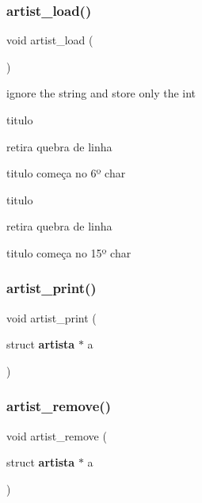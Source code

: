\mbox{\label{menu__artist_8c_ac92e93ea1e283f63cd157c3de3bda0d2}} 
\subsubsection{artist\_load()}
{\footnotesize\ttfamily void artist\+\_\+load (\begin{DoxyParamCaption}{ }\end{DoxyParamCaption})}

ignore the string and store only the int

titulo

retira quebra de linha

titulo começa no 6º char

titulo

retira quebra de linha

titulo começa no 15º char \mbox{\label{menu__artist_8c_a0b753a63f0f576d94160e7d073332c66}} 
\subsubsection{artist\_print()}
{\footnotesize\ttfamily void artist\+\_\+print (\begin{DoxyParamCaption}\item[{struct \textbf{ artista} $\ast$}]{a }\end{DoxyParamCaption})}

\mbox{\label{menu__artist_8c_abc42f3a57f943f92d23752d9650031f9}} 
\subsubsection{artist\_remove()}
{\footnotesize\ttfamily void artist\+\_\+remove (\begin{DoxyParamCaption}\item[{struct \textbf{ artista} $\ast$}]{a }\end{DoxyParamCaption})}

\mbox{\label{menu__artist_8c_a8defa4fde9758146417715dd117615d2}} 
